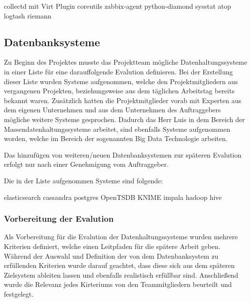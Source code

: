 \begin{outline}
  \1 collectd mit Virt Plugin
  \1 coreutils
  \1 zabbix-agent
  \1 python-diamond
  \1 sysstat
  \1 atop
  \1 logtash
  \1 riemann
\end{outline}

\subsection{Datenbanksysteme}
\label{subsec:datenbanksysteme}
Zu Beginn des Projektes musste das Projektteam mögliche Datenhaltungssysteme
in einer Liste für eine darauffolgende Evalution definieren. Bei der
Erstellung dieser Liste wurden Systeme aufgenommen, welche den 
Projektmitgliedern aus vergangenen Projekten, beziehungsweise aus dem
täglichen Arbeitstag bereits bekannt waren. Zusätzlich hatten die
Projektmitglieder vorab mit Experten aus dem eigenen Unternehmen und
aus dem Unternehmen des Auftraggebers mögliche weitere Systeme gesprochen. 
Dadurch das Herr Luis in dem Bereich der Massendatenhaltungssysteme
arbeitet, sind ebenfalls Systeme aufgenommen worden, welche im
Bereich der sogenannten Big Data Technologie arbeiten.

Das hinzufügen von weiteren/neuen Datenbanksystemen zur späteren
Evalution erfolgt nur nach einer Genehmigung vom Auftraggeber.

Die in der Liste aufgenommen Systeme sind folgende:
\begin{outline}
  \1 elasticsearch
  \1 cassandra
  \1 postgres
  \1 OpenTSDB
  \1 KNIME
  \1 impala
  \1 hadoop
  \1 hive
\end{outline}
\nl%

\subsubsection{Vorbereitung der Evalution}
\label{subsubsec:vorbereitung_der_evalution}
Als Vorbereitung für die Evalution der Datenhaltungssysteme wurden
mehrere Kriterien definiert, welche einen Leitpfaden für die 
spätere Arbeit geben. Während der Auswahl und Definition 
der von dem Datenbanksystem zu erfüllenden Kriterien wurde darauf
geachtet, dass diese sich aus dem späteren Zielsystem ableiten lassen
und ebenfalls realistisch erfüllbar sind. Anschließend wurde die
Relevanz jedes Kirteriums von den Teammitgliedern beurteilt und
festgelegt. 

